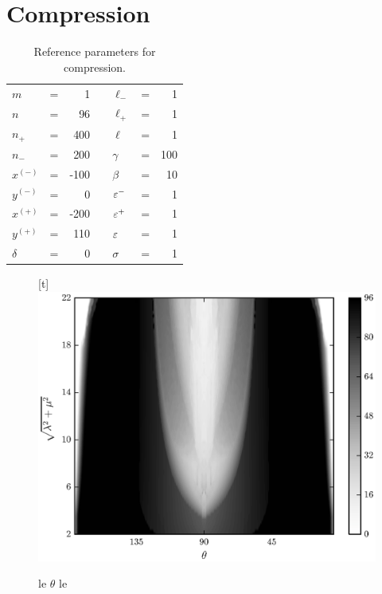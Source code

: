 \section{Compression}

	\begin{table}
		\centering
		\caption{Reference parameters for compression. \label{table:compression_reference}}
		\begin{tabular}{lcrclcr}
			$m$ & = & 1 & \hspace{1in} & $\ell_-$ & = & 1 \\
			$n$ & = & 96 & & $\ell_+$ & = & 1 \\
			$n_+$ & = & 400 & & $\ell$ & = & 1 \\
			$n_-$ & = & 200 & & $\gamma$ & = & 100 \\
			$x^{(-)}$ & = & -100 & & $\beta$ & = & 10 \\
			$y^{(-)}$ & = & 0 & & $\varepsilon^-$ & = & 1 \\
			$x^{(+)}$ & = & -200 & & $\varepsilon^+$ & = & 1 \\
			$y^{(+)}$ & = & 110 & & $\varepsilon$ & = & 1 \\
			$\delta$ & = & 0 & & $\sigma$ & = & 1
		\end{tabular}
	\end{table}

	\begin{figure}
		\begin{center}[t]
			\includegraphics{./fig/ch3/push/ref/grid.eps}
		\end{center}		
		\caption{ le $\theta$ le
		\label{fig:PushGrid:vanilla}}
	\end{figure}	
	
